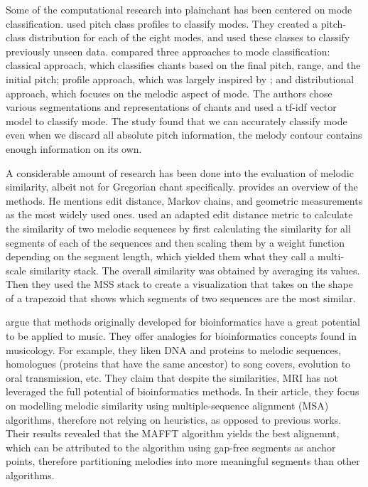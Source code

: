 Some of the computational research into plainchant has been centered on mode classification. \cite{mode_huron} used pitch class profiles to
classify modes. They created a pitch-class distribution for each of the eight modes, and used these classes to classify previously unseen data.
\cite{mode_cornelissen} compared three approaches to mode classification: classical approach, which classifies chants based on
the final pitch, range, and the initial pitch; profile approach, which was largely inspired by \cite{mode_huron}; and distributional approach,
which focuses on the melodic aspect of mode. The authors chose various segmentations and representations of chants and used a tf-idf vector
model to classify mode. The study found that we can accurately classify mode even when we discard all absolute pitch information, the melody
contour contains enough information on its own.

A considerable amount of research has been done into the evaluation of me\-lo\-dic similarity, albeit not for Gregorian chant specifically.
\cite{melodic_similarity} provides an overview of the methods. He mentions edit distance, Markov chains, and geometric measurements as
the most widely used ones. \cite{similarity_plot} used an adapted edit distance metric to calculate the similarity of two melodic sequences
by first calculating the similarity for all segments of each of the sequences and then scaling them by a weight function depending on the
segment length, which yielded them what they call a multi-scale similarity stack. The overall similarity was obtained by averaging its values.
Then they used the MSS stack to create a visualization that takes on the shape of a trapezoid that shows which segments of two sequences
are the most similar.

\cite{similarity_bioinf} argue that methods originally developed for bioinformatics have a great potential to be applied to music. They offer
analogies for bioinformatics concepts found in musicology. For example, they liken DNA and proteins to melodic sequences, homologues (proteins that
have the same ancestor) to song covers, evolution to oral transmission, etc. They claim that despite the similarities, MRI has not leveraged the
full potential of bioinformatics methods. In their article, they focus on modelling melodic similarity using multiple-sequence alignment (MSA)
algorithms, therefore not relying on heuristics, as opposed to previous works. Their results revealed that the MAFFT algorithm yields the best
alignemnt, which can be attributed to the algorithm using gap-free segments as anchor points, therefore partitioning melodies into more meaningful
segments than other algorithms.


